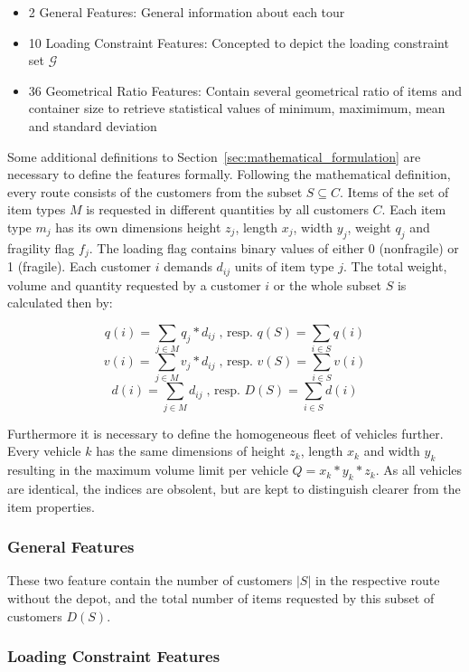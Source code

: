 \begin{itemize}
    \item 2 General Features: General information about each tour
    \item 10 Loading Constraint Features: Concepted to depict the loading constraint set $\mathcal{G}$
    \item 36 Geometrical Ratio Features: Contain several geometrical ratio of items and container size to retrieve
          statistical values of minimum, maximimum, mean and standard deviation
\end{itemize}

Some additional definitions to Section~\ref{sec:mathematical_formulation}
are necessary to define the features formally. Following the mathematical definition, every route consists of the customers
from the subset $S \subseteq C$. Items of the set of item types $M$ is requested in different quantities by all customers $C$.
Each item type $m_j$ has its own dimensions height $z_j$, length $x_j$, width $y_j$, weight $q_j$ and fragility flag $f_j$.
The loading flag contains binary values of either 0 (nonfragile) or 1 (fragile).
Each customer $i$ demands $d_{ij}$ units of item type $j$.
The total weight, volume and quantity requested by a customer $i$ or the whole subset $S$ is calculated then by:

\[q(i) = \sum_{j \in M} q_j * d_{ij}\;\text{, resp. } q(S) = \sum_{i\in S} q(i)\]
\[v(i) = \sum_{j \in M} v_j * d_{ij}\;\text{, resp. } v(S) = \sum_{i\in S} v(i)\]
\[d(i) = \sum_{j \in M} d_{ij}\;\text{, resp. } D(S) = \sum_{i\in S} d(i)\]

Furthermore it is necessary to define the homogeneous fleet of vehicles
further. Every vehicle $k$ has the same dimensions of height $z_k$, length $x_k$ and width $y_k$ resulting in the maximum volume limit per
vehicle $Q = x_k *y_k*z_k$. As all vehicles are identical, the indices are obsolent, but are kept to distinguish clearer
from the item properties.

\subsubsection{General Features}
These two feature contain the number of customers $|S|$ in the respective route without the depot, and the total number of items requested by
this subset of customers $D(S)$.

\subsubsection{Loading Constraint Features}

